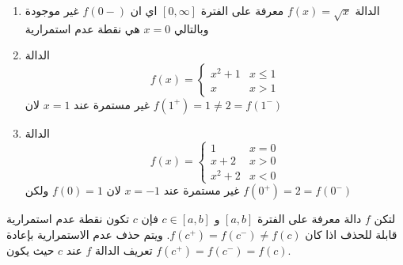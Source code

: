 \begin{enumerate}
	\item الدالة $f(x) = \sqrt{x}$ معرفة على الفترة $[0, \infty]$ اي ان $f(0-)$ غير موجودة وبالتالي $x=0$ هي نقطة عدم استمرارية
	\item الدالة
	\[
	f(x) =
	\begin{cases}
		x^2 + 1 & x\leq 1 \\
		x & x>1
	\end{cases}
	\]
	غير مستمرة عند $x=1$ لان 
	$f(1^+) = 1 \neq 2 = f(1^-)$
	\begin{figure}[H]
		\centering
		\caption{}
	\end{figure}
	
	\item الدالة
	\[
	f(x) = 
	\begin{cases}
		1 & x=0 \\
		x+2 & x>0\\
		x^2+2& x<0
	\end{cases}
	\]
	غير مستمرة عند $x=-1$ لان $f(0) = 1$ ولكن $f(0^+) = 2=f(0^-)$
	\begin{figure}[H]
		\centering
				\caption{}
	\end{figure}
\end{enumerate}

\begin{definition}
	لتكن $f$ دالة معرفة على الفترة $[a, b]$ و $c\in [a, b]$ فإن $c$ تكون نقطة عدم استمرارية قابلة للحذف اذا كان $f(c^+) = f(c^-) \neq f(c)$. ويتم حذف عدم الاستمرارية بإعادة تعريف الدالة $f$ عند $c$ حيث يكون  $f(c^+) = f(c^-) = f(c)$.
\end{definition}

